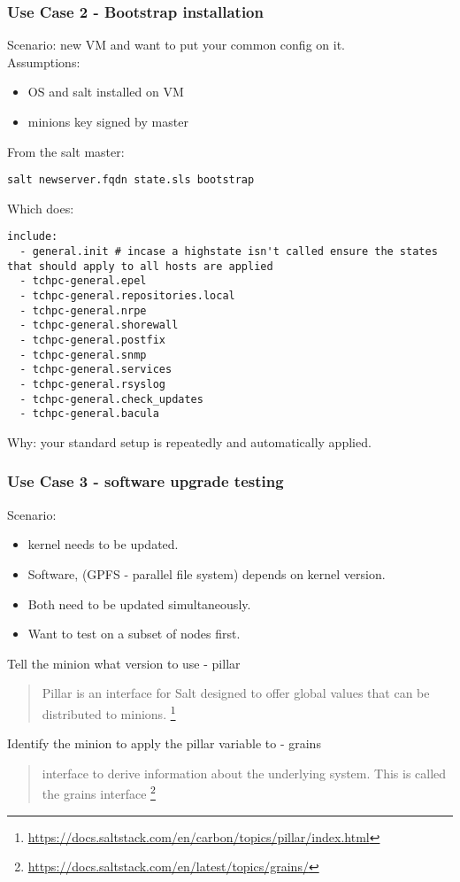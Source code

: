 \documentclass{beamer}
\begin{document}
\begin{frame}[fragile]
\frametitle{Use Case 2 - Bootstrap installation}
Scenario: new VM and want to put your common config on it.\\
Assumptions:\\
\begin{itemize}
\item OS and salt installed on VM
\item minions key signed by master
\end{itemize}
From the salt master:\\
\begin{lstlisting}[basicstyle=\tiny,]
salt newserver.fqdn state.sls bootstrap
\end{lstlisting}
Which does:\\
\begin{lstlisting}[basicstyle=\tiny,]
include:
  - general.init # incase a highstate isn't called ensure the states that should apply to all hosts are applied
  - tchpc-general.epel
  - tchpc-general.repositories.local
  - tchpc-general.nrpe
  - tchpc-general.shorewall
  - tchpc-general.postfix
  - tchpc-general.snmp
  - tchpc-general.services
  - tchpc-general.rsyslog
  - tchpc-general.check_updates
  - tchpc-general.bacula
\end{lstlisting}
Why: your standard setup is repeatedly and automatically applied.
\end{frame}

\begin{frame}
\frametitle{Use Case 3 - software upgrade testing}
Scenario:\\
\begin{itemize}
\item kernel needs to be updated.
\item Software, (GPFS - parallel file system) depends on kernel version.
\item Both need to be updated simultaneously.
\item Want to test on a subset of nodes first.
\end{itemize}
Tell the minion what version to use - pillar\\
\begin{quote}
Pillar is an interface for Salt designed to offer global values that can be distributed to minions.
\footnote{\url{https://docs.saltstack.com/en/carbon/topics/pillar/index.html}}
\end{quote}
Identify the minion to apply the pillar variable to - grains\\
\begin{quote}
interface to derive information about the underlying system. This is called the grains interface
\footnote{\url{https://docs.saltstack.com/en/latest/topics/grains/}}
\end{quote}
\end{frame}
\end{document}
